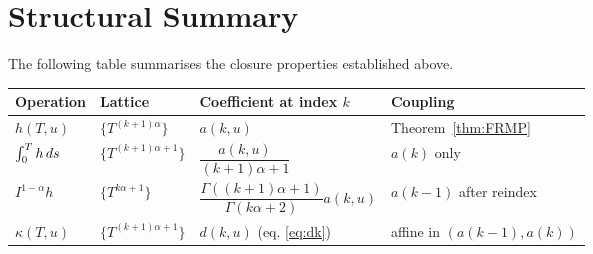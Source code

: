 \documentclass{article}
\begin{document}
\section{Structural Summary}\label{sec:structure}

The following table summarises the closure properties established above.

\begin{center}
  \begin{tabular}{llll}
    \hline
    Operation & Lattice & Coefficient at index $k$ & Coupling\\
    \hline
    $h (T, u)$ & $\{T^{(k + 1) \alpha} \}$ & $a (k, u)$ &
    Theorem~\ref{thm:FRMP}\\
    $\int_0^T h \hspace{0.17em} ds$ & $\{T^{(k + 1) \alpha + 1} \}$ &
    $\dfrac{a (k, u)}{(k + 1) \alpha + 1}$ & $a (k)$ only\\
    $I^{1 - \alpha} h$ & $\{T^{k \alpha + 1} \}$ & $\dfrac{\Gamma ((k + 1)
    \alpha + 1)}{\Gamma (k \alpha + 2)} a (k, u)$ & $a (k - 1)$ after
    reindex\\
    $\kappa (T, u)$ & $\{T^{(k + 1) \alpha + 1} \}$ & $d (k, u)$ (eq.
    \eqref{eq:dk}) & affine in $(a (k - 1), a (k))$\\
    \hline
  \end{tabular}
\end{center}
\end{document}
